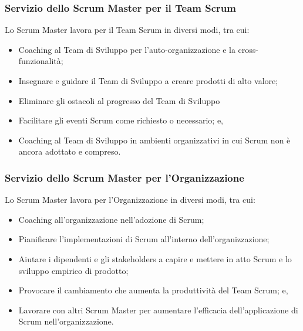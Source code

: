 \subsubsection*{Servizio dello Scrum Master per il Team Scrum} %
\label{ssub:sm_service_to_team}
Lo Scrum Master lavora per il Team Scrum in diversi modi, tra cui:
\begin{itemize}
	\item Coaching al Team di Sviluppo per l'auto-organizzazione e la cross-funzionalit\`a;
	\item Insegnare e guidare il Team di Sviluppo a creare prodotti di alto valore;
	\item Eliminare gli ostacoli al progresso del Team di Sviluppo
	\item Facilitare gli eventi Scrum come richiesto o necessario; e,
	\item Coaching al Team di Sviluppo in ambienti organizzativi in cui Scrum non \`e ancora adottato e compreso.
\end{itemize}

\subsubsection*{Servizio dello Scrum Master per l'Organizzazione} %
\label{ssub:sm_service_to_org}
Lo Scrum Master lavora per l'Organizzazione in diversi modi, tra cui:
\begin{itemize}
	\item Coaching all'organizzazione nell'adozione di Scrum;
	\item Pianificare l'implementazioni di Scrum all'interno dell'organizzazione;
	\item Aiutare i dipendenti e gli stakeholders a capire e mettere in atto Scrum e lo sviluppo empirico di prodotto;
	\item Provocare il cambiamento che aumenta la produttivit\`a del Team Scrum; e,
	\item Lavorare con altri Scrum Master per aumentare l'efficacia dell'applicazione di Scrum nell'organizzazione.
\end{itemize}

